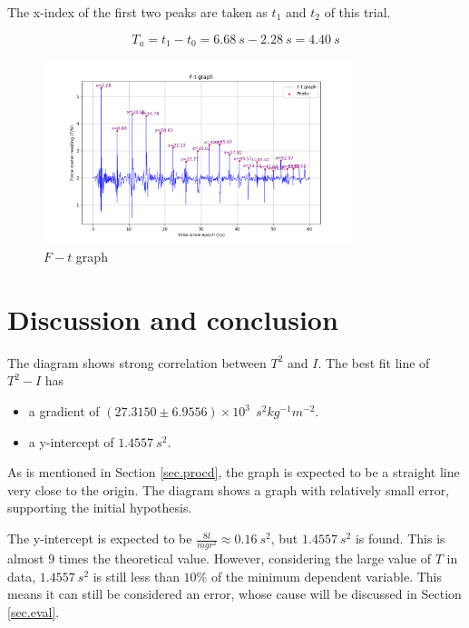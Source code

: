 \documentclass[a4paper]{article}
\begin{document}
The x-index of the first two peaks are taken as $t_1$ and $t_2$ of this trial.

$$T_a = t_1 - t_0 = {\SI{6.68}{s} -  \SI{2.28}{s}} = \SI{4.40}{s}$$

\begin{figure}
    \centering
    \includegraphics[width = 0.8\textwidth]{graphft.png}
    \caption{$F - t$ graph}
    \label{fig.ft}
\end{figure}

\section{Discussion and conclusion}

\label{sec.discussion}

The diagram shows strong correlation between $T^2$ and $I$. The best fit line of $T^2 - I$ has 

\begin{itemize}
    \item a gradient of $(27.3150 \pm 6.9556) \times 10^3\ \SI{}{s^2kg^{-1}m^{-2}}$.
    \item a y-intercept of $1.4557 \SI{}{s^2}$.
\end{itemize}

As is mentioned in Section \ref{sec.procd}, the graph is expected to be a straight line very close to the origin. The diagram shows a graph with relatively small error, supporting the initial hypothesis.

The y-intercept is expected to be $\frac{8l}{mgr^2} \approx 0.16\SI{}{s^2}$, but $1.4557\SI{}{s^2}$ is found. This is almost $9$ times the theoretical value. However, considering the large value of $T$ in data, $1.4557\SI{}{s^2}$ is still less than $10\%$ of the minimum dependent variable. This means it can still be considered an error, whose cause will be discussed in Section \ref{sec.eval}.
\end{document}
